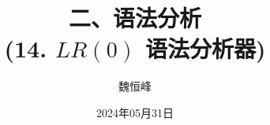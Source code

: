 \documentclass[]{beamer}
\title[语法分析]{二、语法分析 \\ (14. $LR(0)$ 语法分析器)}
\author[魏恒峰]{\large 魏恒峰}
\institute{hfwei@nju.edu.cn}
\date{2024年05月31日}
\begin{document}
\maketitle



\thankyou{}

\end{document}

